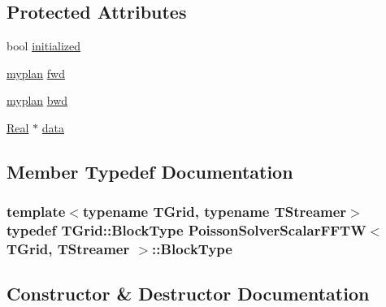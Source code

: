 \subsection*{Protected Attributes}
\begin{DoxyCompactItemize}
\item 
bool \hyperlink{class_poisson_solver_scalar_f_f_t_w_a14ffa693193fcc1d5391c452dcf11d34}{initialized}
\item 
\hyperlink{_poisson_solver_scalar_f_f_t_w_8h_afe6b9e6e658d7ab1dc0b912d56754891}{myplan} \hyperlink{class_poisson_solver_scalar_f_f_t_w_a7773ce95a3312d7a5213c060586aed4b}{fwd}
\item 
\hyperlink{_poisson_solver_scalar_f_f_t_w_8h_afe6b9e6e658d7ab1dc0b912d56754891}{myplan} \hyperlink{class_poisson_solver_scalar_f_f_t_w_a01d910395049c4252d4924baa032b13d}{bwd}
\item 
\hyperlink{_h_d_f5_dumper_8h_a445a5f0e2a34c9d97d69a3c2d1957907}{Real} $\ast$ \hyperlink{class_poisson_solver_scalar_f_f_t_w_ae4f5219ed358cd8d227084a7fa92e686}{data}
\end{DoxyCompactItemize}


\subsection{Member Typedef Documentation}
\hypertarget{class_poisson_solver_scalar_f_f_t_w_ad496c7981a6167c70ccd329d4b37888d}{}
\subsubsection[{Block\+Type}]{\setlength{\rightskip}{0pt plus 5cm}template$<$typename T\+Grid, typename T\+Streamer$>$ typedef T\+Grid\+::\+Block\+Type {\bf Poisson\+Solver\+Scalar\+F\+F\+T\+W}$<$ T\+Grid, T\+Streamer $>$\+::{\bf Block\+Type}\hspace{0.3cm}{\ttfamily [protected]}}\label{class_poisson_solver_scalar_f_f_t_w_ad496c7981a6167c70ccd329d4b37888d}


\subsection{Constructor \& Destructor Documentation}
\hypertarget{class_poisson_solver_scalar_f_f_t_w_ad30e877f71d90ed725b4f6dc073d15b1}{}
